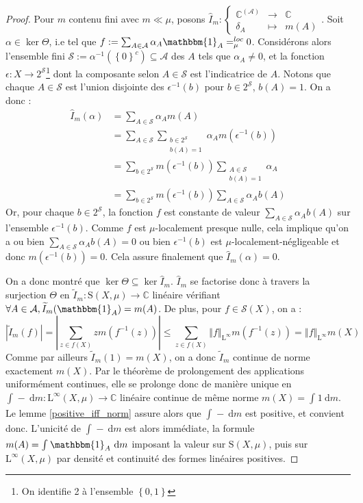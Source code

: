 \documentclass[a4paper,12pt]{article}
\newcommand{\C}{\mathbb{C}}
\newcommand{\norm}[1]{\left\Vert #1\right\Vert}
\newcommand{\abs}[1]{\left\vert#1\right\vert}
\newcommand{\set}[1]{\left\{ #1 \right\}}
\newcommand{\indic}{\mathbbm{1}}
\newcommand{\integral}[4]{\int_{#1}^{#2} #3~\mathrm{d}#4}
\newcommand\fundef[3]{#1: \left\{\begin{array}{ccc}#2\\#3\end{array}\right.}
\newcommand{\inv}{^{-1}}
\newcommand{\compl}{^c}
\newcommand{\blank}{{-}}
\begin{document}
\begin{proof}
    Pour $m$ contenu fini avec $m\ll\mu$, posons $\fundef{\widehat{I}_m}{\C^{(\mathcal{A})}&\to&\C}{\delta_A&\mapsto&m(A)}$.
    Soit $\alpha\in\ker\Theta$, i.e tel que $f := \sum_{A\in\mathcal{A}} \alpha_A\indic_A =_\mu^{loc} 0$. Considérons alors l'ensemble 
    fini $\mathcal{S}:=\alpha\inv\left(\set{0}\compl\right)\subseteq\mathcal{A}$ des $A$ tels que $\alpha_A\ne 0$, et la fonction 
    $\epsilon:X\to 2^\mathcal{S}$\footnote{On identifie 2 à l'ensemble $\set{0, 1}$} dont la composante selon $A\in\mathcal{S}$
    est l'indicatrice de $A$. Notons que chaque $A\in\mathcal{S}$ est l'union disjointe des $\epsilon\inv(b)$ pour $b\in2^\mathcal{S}$, $b(A) = 1$.
    On a donc :
    \begin{align*}
        \widehat{I}_m(\alpha) 
            &= \sum_{A\in\mathcal{S}} \alpha_A m(A) \\
            &= \sum_{A\in\mathcal{S}} \sum_{\substack{b\in2^\mathcal{S} \\ b(A) = 1}} \alpha_A m(\epsilon\inv(b)) \\
            &= \sum_{b\in2^\mathcal{S}} m(\epsilon\inv(b)) \sum_{\substack{A\in\mathcal{S} \\ b(A) = 1}} \alpha_A \\
            &= \sum_{b\in2^\mathcal{S}} m(\epsilon\inv(b)) \sum_{A\in\mathcal{S}} \alpha_A b(A)
    \end{align*}
    Or, pour chaque $b\in2^\mathcal{S}$, la fonction $f$ est constante de valeur $\sum_{A\in\mathcal{S}} \alpha_A b(A)$ sur l'ensemble 
    $\epsilon\inv(b)$. Comme $f$ est $\mu$-localement presque nulle, cela implique qu'on a ou bien $\sum_{A\in\mathcal{S}} \alpha_A b(A)=0$ ou bien $\epsilon\inv(b)$ est $\mu$-localement-négligeable et donc $m(\epsilon\inv(b)) = 0$.
    Cela assure finalement que $\widehat{I}_m(\alpha) = 0$.

    On a donc montré que $\ker\Theta\subseteq\ker\widehat{I}_m$. $\widehat{I}_m$ se factorise donc à travers la surjection $\Theta$ en
    $\widetilde{I}_m:\mathrm{S}(X, \mu)\to\C$ linéaire vérifiant $\forall A\in\mathcal{A}, \widetilde{I}_m(\indic_A) = m(A)$. De plus, pour 
    $f\in\mathscr{S}(X)$, on a :
    \begin{equation*}
        \abs{\widetilde{I}_m(f)} = \abs{\sum_{z\in f(X)} zm(f\inv(z))} \le \sum_{z\in f(X)} \norm{f}_{\mathrm{L}^\infty} m(f\inv(z)) = \norm{f}_{\mathrm{L}^\infty} m(X)
    \end{equation*}
    Comme par ailleurs $\widetilde{I}_m(1)=m(X)$, on a donc $\widetilde{I}_m$ continue de norme exactement $m(X)$.
    Par le théorème de prolongement des applications uniformément continues, elle se prolonge donc de manière unique en $\integral{}{}{\blank}{m} : \mathrm{L}^\infty(X, \mu)\to\C$
    linéaire continue de même norme $m(X) = \integral{}{}{1}{m}$. Le lemme \ref{positive_iff_norm} assure alors que $\integral{}{}{\blank}{m}$ est positive, et convient donc. 
    L'unicité de $\integral{}{}{\blank}{m}$ est alors 
    immédiate, la formule $m(A) = \integral{}{}{\indic_A}{m}$ imposant la valeur sur $\mathrm{S}(X, \mu)$, puis sur $\mathrm{L}^\infty(X, \mu)$ par densité et continuité des formes linéaires 
    positives.


\end{proof}
\end{document}
